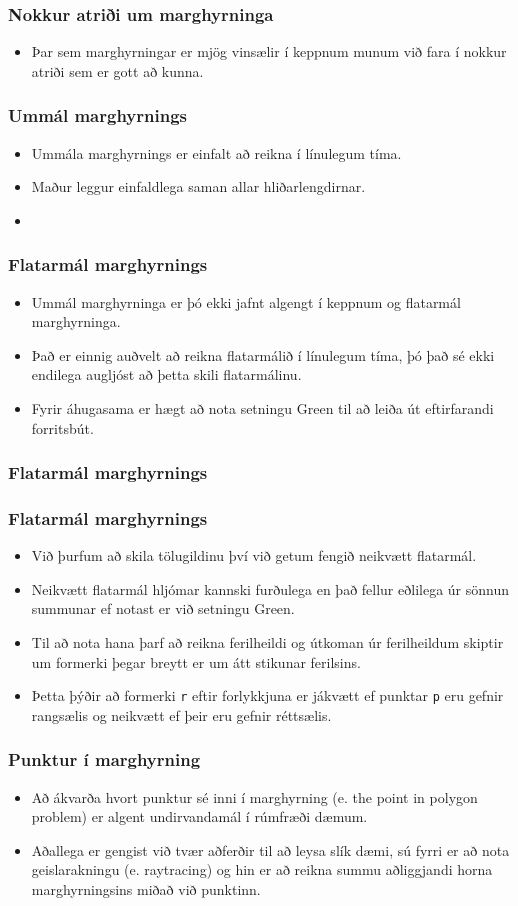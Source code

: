 \documentclass{beamer}
\newcommand\env[2]
{
	\begin{#1}
	#2
	\end{#1}
}
\newcommand\code[1]{\tiny}
\begin{document}
\env{frame}
{
	\frametitle{Nokkur atriði um marghyrninga}
	\env{itemize}
	{
		\item<1-> Þar sem marghyrningar er mjög vinsælir í keppnum munum við fara í nokkur atriði sem er gott að kunna.
	}
}

\env{frame}
{
	\frametitle{Ummál marghyrnings}
	\env{itemize}
	{
		\item<1-> Ummála marghyrnings er einfalt að reikna í línulegum tíma.
		\item<2-> Maður leggur einfaldlega saman allar hliðarlengdirnar.
		\item<3-> \code{ummal.h}
	}
}

\env{frame}
{
	\frametitle{Flatarmál marghyrnings}
	\env{itemize}
	{
		\item<1-> Ummál marghyrninga er þó ekki jafnt algengt í keppnum og flatarmál marghyrninga.
		\item<2-> Það er einnig auðvelt að reikna flatarmálið í línulegum tíma, þó það sé ekki
			endilega augljóst að þetta skili flatarmálinu.
		\item<3-> Fyrir áhugasama er hægt að nota setningu Green til að leiða út eftirfarandi forritsbút.
	}
}

\env{frame}
{
	\frametitle{Flatarmál marghyrnings}
	\code{flatarmal.h}
}

\env{frame}
{
	\frametitle{Flatarmál marghyrnings}
	\env{itemize}
	{
		\item<1-> Við þurfum að skila tölugildinu því við getum fengið neikvætt flatarmál.
		\item<2-> Neikvætt flatarmál hljómar kannski furðulega en það fellur eðlilega úr sönnun summunar
			ef notast er við setningu Green.
		\item<3-> Til að nota hana þarf að reikna ferilheildi og útkoman úr ferilheildum skiptir
			um formerki þegar breytt er um átt stikunar ferilsins.
		\item<4-> Þetta þýðir að formerki \texttt{r} eftir forlykkjuna er jákvætt ef punktar \texttt{p} 
			eru gefnir rangsælis og neikvætt ef þeir eru gefnir réttsælis.
	}
}

\env{frame}
{
	\frametitle{Punktur í marghyrning}
	\env{itemize}
	{
		\item<1-> Að ákvarða hvort punktur sé inni í marghyrning (e. the point in polygon problem) er algent undirvandamál
			í rúmfræði dæmum.
		\item<2-> Aðallega er gengist við tvær aðferðir til að leysa slík dæmi, sú fyrri er að nota geislarakningu 
			(e. raytracing) og hin er að reikna summu aðliggjandi horna marghyrningsins miðað við punktinn.
	}
}
\end{document}
